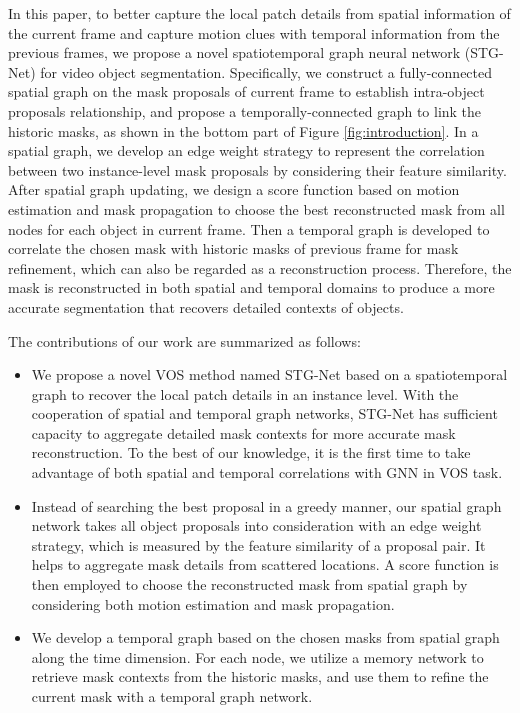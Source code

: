 \documentclass[letterpaper]{article} \usepackage{aaai21}  \usepackage{times}  \usepackage{helvet} \usepackage{courier}  \usepackage[hyphens]{url}  \usepackage{graphicx} \urlstyle{rm} \def\UrlFont{\rm}  \usepackage{graphicx}  \usepackage{natbib}  \usepackage{caption} \frenchspacing  \setlength{\pdfpagewidth}{8.5in}  \setlength{\pdfpageheight}{11in}  \usepackage{amsmath}
\begin{document}
In this paper, to better capture the local patch details from spatial information of the current frame and capture motion clues with temporal information from the previous frames, we propose a novel spatiotemporal graph neural network (STG-Net) for video object segmentation. Specifically, we construct a fully-connected spatial graph on the mask proposals of current frame to establish intra-object proposals relationship, and propose a temporally-connected graph to link the historic masks, as shown in the bottom part of Figure \ref{fig:introduction}. In a spatial graph, we develop an edge weight strategy to represent the correlation between two instance-level mask proposals by considering their feature similarity. After spatial graph updating, we design a score function based on motion estimation and mask propagation to choose the best reconstructed mask from all nodes for each object in current frame. Then a temporal graph is developed to correlate the chosen mask with historic masks of previous frame for mask refinement, which can also be regarded as a reconstruction process. Therefore, the mask is reconstructed in both spatial and temporal domains to produce a more accurate segmentation that recovers detailed contexts of objects.


The contributions of our work are summarized as follows:
\begin{itemize}
    \item We propose a novel VOS method named STG-Net based on a spatiotemporal graph to recover the local patch details in an instance level. With the cooperation of spatial and temporal graph networks, STG-Net has sufficient capacity to aggregate detailed mask contexts for more accurate mask reconstruction. To the best of our knowledge, it is the first time to take advantage of both spatial and temporal correlations with GNN in VOS task.
\item 
    Instead of searching the best proposal in a greedy manner, our spatial graph network takes all object proposals into consideration with an edge weight strategy, which is measured by the feature similarity of a proposal pair. It helps to aggregate mask details from scattered locations. A score function is then employed to choose the reconstructed mask from spatial graph by considering both motion estimation and mask propagation.
    \item We develop a temporal graph based on the chosen masks from spatial graph along the time dimension. For each node, we utilize a memory network to retrieve mask contexts from the historic masks, and use them to refine the current mask with a temporal graph network.
\end{itemize}
\end{document}
